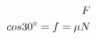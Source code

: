 \documentclass[preview]{standalone}
\begin{document}
\begin{align*}
\special{dvisvgm:raw <g id='unique000'>}F \\cos 30^{\circ} = f = \mu N\special{dvisvgm:raw </g>}
\end{align*}
\end{document}
